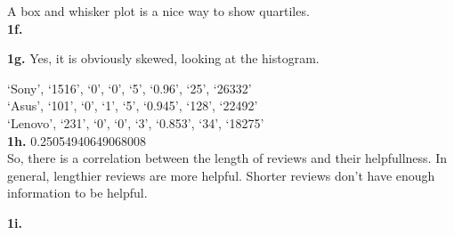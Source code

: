 \documentclass[10pt]{amsart}
\begin{document}
A box and whisker plot is a nice way to show quartiles.\\

\textbf{1f.} \\


\textbf{1g.} Yes, it is obviously skewed, looking at the histogram.

`Sony', `1516', `0', `0', `5', `0.96', `25', `26332' \\
`Asus', `101', `0', `1', `5', `0.945', `128', `22492' \\
`Lenovo', `231', `0', `0', `3', `0.853', `34', `18275' \\

\textbf{1h.} 0.25054940649068008 \\

So, there is a correlation between the length of reviews and their helpfullness.
In general, lengthier reviews are more helpful. Shorter reviews don't have
enough information to be helpful. 

\textbf{1i.} \\

\end{document}

